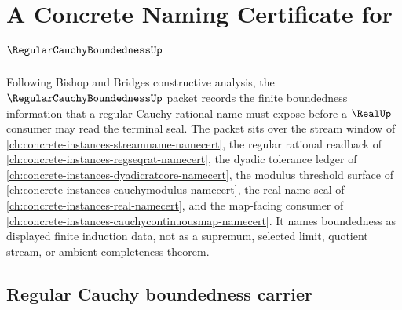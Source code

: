 \chapter{A Concrete Naming Certificate for $\RegularCauchyBoundednessUp$}
\label{ch:concrete-instances-regular-cauchy-boundedness-namecert}

Following Bishop and Bridges constructive analysis, the $\RegularCauchyBoundednessUp$ packet records the finite boundedness information that a regular Cauchy rational name must expose before a $\RealUp$ consumer may read the terminal seal. The packet sits over the stream window of \autoref{ch:concrete-instances-streamname-namecert}, the regular rational readback of \autoref{ch:concrete-instances-regseqrat-namecert}, the dyadic tolerance ledger of \autoref{ch:concrete-instances-dyadicratcore-namecert}, the modulus threshold surface of \autoref{ch:concrete-instances-cauchymodulus-namecert}, the real-name seal of \autoref{ch:concrete-instances-real-namecert}, and the map-facing consumer of \autoref{ch:concrete-instances-cauchycontinuousmap-namecert}. It names boundedness as displayed finite induction data, not as a supremum, selected limit, quotient stream, or ambient completeness theorem.

\section{Regular Cauchy boundedness carrier}
\label{sec:regular-cauchy-boundedness-carrier}

